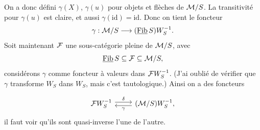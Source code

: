On a donc défini $\gamma(X)$, $\gamma(u)$ pour objets et flèches de $\mathcal{M}/S$. La transitivité pour $\gamma(u)$ est
claire, et aussi $\gamma(\mathrm{id})=\mathrm{id}$. Donc on tient le foncteur
\[
\gamma:\mathcal{M}/S\longrightarrow(\underline{\mathrm{Fib}}\, S)W_S^{-1}.
\]
Soit maintenant $\mathcal{F}$ une sous-catégorie pleine de $\mathcal{M}/S$, avec
\[
\underline{\mathrm{Fib}}\, S\subseteq\mathcal{F}\subseteq\mathcal{M}/S,
\]
considérons $\gamma$ comme foncteur à valeurs dans $\mathcal{F} W_S^{-1}$. (J'ai oublié de vérifier que $\gamma$ transforme
$W_S$ dans $W_S$, mais c'est tautologique.) Ainsi on a des foncteurs

\[
\begin{tikzcd}
\mathcal{F}W_S^{-1} \arrow[r, shift left, "\delta"] & (\mathcal{M}/S)W_S^{-1}, \arrow[l, shift left, "\gamma"]
\end{tikzcd}
\]
il faut voir qu'ils sont quasi-inverse l'une de  l'autre.

